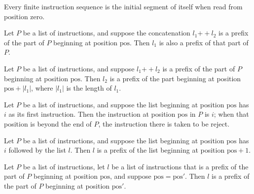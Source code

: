 \begin{theorem}
\label{WordRAM.codeAt_self}
\leanok
{}
Every finite instruction sequence is the initial segment of itself when read from
position zero.
\end{theorem}

\begin{theorem}
\label{WordRAM.CodeAt.left}
\leanok
{}
Let $P$ be a list of instructions, and suppose the concatenation $l_1\mathbin{++}l_2$ is
a prefix of the part of $P$ beginning at position $\mathrm{pos}$. Then $l_1$ is also a
prefix of that part of $P$.
\end{theorem}

\begin{theorem}
\label{WordRAM.CodeAt.right}
\leanok
{}
Let $P$ be a list of instructions, and suppose $l_1\mathbin{++}l_2$ is a prefix of the
part of $P$ beginning at position $\mathrm{pos}$. Then $l_2$ is a prefix of the part
beginning at position $\mathrm{pos}+|l_1|$, where $|l_1|$ is the length of $l_1$.
\end{theorem}

\begin{theorem}
\label{WordRAM.CodeAt.head}
\leanok
{}
Let $P$ be a list of instructions, and suppose the list beginning at position
$\mathrm{pos}$ has $i$ as its first instruction. Then the instruction at position
$\mathrm{pos}$ in $P$ is $i$; when that position is beyond the end of $P$, the
instruction there is taken to be reject.
\end{theorem}

\begin{theorem}
\label{WordRAM.CodeAt.tail}
\leanok
{}
Let $P$ be a list of instructions, and suppose the list beginning at position
$\mathrm{pos}$ has $i$ followed by the list $l$. Then $l$ is a prefix of the list
beginning at position $\mathrm{pos}+1$.
\end{theorem}

\begin{theorem}
\label{WordRAM.CodeAt.cast_pos}
\leanok
{}
Let $P$ be a list of instructions, let $l$ be a list of instructions that is a prefix of
the part of $P$ beginning at position $\mathrm{pos}$, and suppose
$\mathrm{pos}=\mathrm{pos}'$. Then $l$ is a prefix of the part of $P$ beginning at
position $\mathrm{pos}'$.
\end{theorem}

